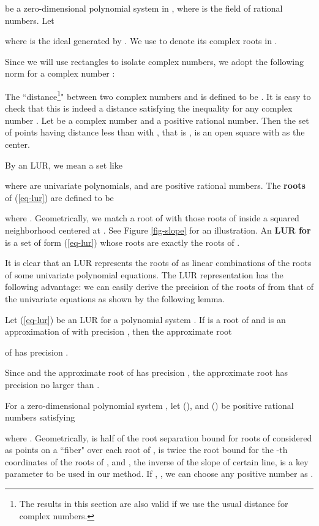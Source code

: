 \documentclass[amsthm]{JSC_LaTex_2007_Mar_12/elsart}
\def\bref#1{(\ref{#1})}
\begin{document}
be a zero-dimensional polynomial system in ,
where  is the field of rational numbers. Let
 
where  is the ideal generated by .
We use  to denote its complex roots in .

Since we will use rectangles to isolate complex numbers, we adopt
the following norm for a complex number :

The ``distance\footnote{The results in this section are also valid
if we use the usual distance for complex numbers.}" between two
complex numbers  and  is defined to be . It is
easy to check that this is indeed a distance satisfying the
inequality  for any complex
number .
Let  be a complex number and  a positive rational number.
Then the set of points having distance less than  with ,
that is , is an open square with
 as the center.


By an LUR, we mean a set like

where  are univariate polynomials,  and 
are positive rational numbers. The {\bf roots} of \bref{eq-lur} are
defined to be

where . Geometrically, we match a root  of
 with those roots of  inside a squared
neighborhood centered at . See Figure \ref{fig-slope} for
an illustration.
An {\bf LUR for } is a set of form \bref{eq-lur} whose
roots are exactly the roots of .

It is clear that an LUR represents the roots of  as
linear combinations of the roots of some univariate polynomial
equations. The LUR representation has the following advantage: we
can easily derive the precision of the roots of  from
that of the univariate equations as shown by the following lemma.

\begin{lem}
Let \bref{eq-lur} be an LUR for a polynomial system . If
 is a root of  and
 is an approximation of  with
precision , then the approximate root


of  has precision .
\end{lem}
\begin{pf} Since  and the
approximate root  of  has precision
,  the approximate root 
has precision no larger than
.
\end{pf}

For a zero-dimensional polynomial system , let  (), and  () be positive
rational numbers satisfying

where .
Geometrically,  is half of the root separation bound for roots
of  considered as points on a ``fiber" over each root of
,  is twice the root bound for the -th
coordinates of the roots of , and , the inverse of the
slope of certain line, is a key parameter to be used in our method.
If , , we can choose any positive number as .
\end{document}
